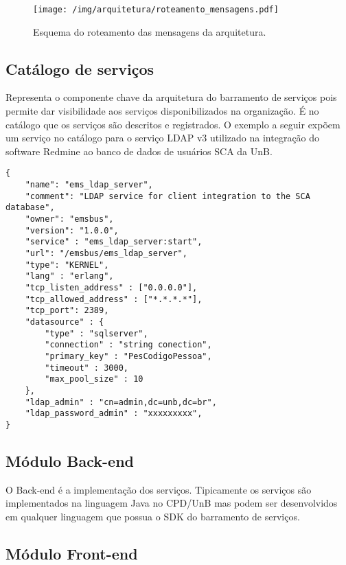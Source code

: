 \begin{figure}[htb]
\centering
\texttt{[image: /img/arquitetura/roteamento\_mensagens.pdf]}
\caption{Esquema do roteamento das mensagens da arquitetura.}
\label{fig:roteamento_mensagens}
\end{figure}
\FloatBarrier


\subsection{Catálogo de serviços}

Representa o componente chave da arquitetura do barramento de serviços pois permite
dar visibilidade aos serviços disponibilizados na organização. É no catálogo que 
os serviços são descritos e registrados. O exemplo a seguir expõem um serviço no catálogo 
para o serviço LDAP v3 utilizado na integração do software Redmine 
ao banco de dados de usuários SCA da UnB.


\renewcommand{\lstlistingname}{Código}             
\begin{lstlisting}[caption=Exemplo de um serviço no catálogo de serviços., label=fig:catalogo_processo] 
{
	"name": "ems_ldap_server",
	"comment": "LDAP service for client integration to the SCA database",
	"owner": "emsbus",
	"version": "1.0.0",
	"service" : "ems_ldap_server:start",
	"url": "/emsbus/ems_ldap_server",
	"type": "KERNEL",
	"lang" : "erlang",
	"tcp_listen_address" : ["0.0.0.0"],
	"tcp_allowed_address" : ["*.*.*.*"],
	"tcp_port": 2389,
	"datasource" : {
		"type" : "sqlserver",
		"connection" : "string conection",
		"primary_key" : "PesCodigoPessoa",
		"timeout" : 3000,
		"max_pool_size" : 10
	},	
	"ldap_admin" : "cn=admin,dc=unb,dc=br",
	"ldap_password_admin" : "xxxxxxxxx",
}
\end{lstlisting}


\subsection{Módulo Back-end}

O Back-end é a implementação dos serviços. Tipicamente
os serviços são implementados na linguagem Java no CPD/UnB
mas podem ser desenvolvidos em qualquer linguagem que possua 
o SDK do barramento de serviços. 


\subsection{Módulo Front-end}

